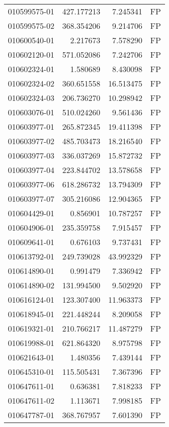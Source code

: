 \begin{tabular}{lrrl}
010599575-01 &  427.177213 &     7.245341 &   FP \\
010599575-02 &  368.354206 &     9.214706 &   FP \\
010600540-01 &    2.217673 &     7.578290 &   FP \\
010602120-01 &  571.052086 &     7.242706 &   FP \\
010602324-01 &    1.580689 &     8.430098 &   FP \\
010602324-02 &  360.651558 &    16.513475 &   FP \\
010602324-03 &  206.736270 &    10.298942 &   FP \\
010603076-01 &  510.024260 &     9.561436 &   FP \\
010603977-01 &  265.872345 &    19.411398 &   FP \\
010603977-02 &  485.703473 &    18.216540 &   FP \\
010603977-03 &  336.037269 &    15.872732 &   FP \\
010603977-04 &  223.844702 &    13.578658 &   FP \\
010603977-06 &  618.286732 &    13.794309 &   FP \\
010603977-07 &  305.216086 &    12.904365 &   FP \\
010604429-01 &    0.856901 &    10.787257 &   FP \\
010604906-01 &  235.359758 &     7.915457 &   FP \\
010609641-01 &    0.676103 &     9.737431 &   FP \\
010613792-01 &  249.739028 &    43.992329 &   FP \\
010614890-01 &    0.991479 &     7.336942 &   FP \\
010614890-02 &  131.994500 &     9.502920 &   FP \\
010616124-01 &  123.307400 &    11.963373 &   FP \\
010618945-01 &  221.448244 &     8.209058 &   FP \\
010619321-01 &  210.766217 &    11.487279 &   FP \\
010619988-01 &  621.864320 &     8.975798 &   FP \\
010621643-01 &    1.480356 &     7.439144 &   FP \\
010645310-01 &  115.505431 &     7.367396 &   FP \\
010647611-01 &    0.636381 &     7.818233 &   FP \\
010647611-02 &    1.113671 &     7.998185 &   FP \\
010647787-01 &  368.767957 &     7.601390 &   FP \\

\end{tabular}
